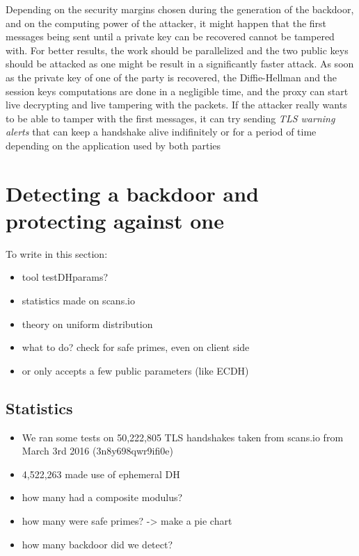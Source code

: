 \documentclass[a4paper,11pt,twocolumn]{article}
\begin{document}
Depending on the security margins chosen during the generation of the backdoor, and on the computing power of the attacker, it might happen that the first messages being sent until a private key can be recovered cannot be tampered with. For better results, the work should be parallelized and the two public keys should be attacked as one might be result in a significantly faster attack. As soon as the private key of one of the party is recovered, the Diffie-Hellman and the session keys computations are done in a negligible time, and the proxy can start live decrypting and live tampering with the packets. If the attacker really wants to be able to tamper with the first messages, it can try sending \emph{TLS warning alerts} that can keep a handshake alive indifinitely or for a period of time depending on the application used by both parties

\section{Detecting a backdoor and protecting against one}

To write in this section:

\begin{itemize}
    \item tool testDHparams?
    \item statistics made on scans.io
    \item theory on uniform distribution
    \item what to do? check for safe primes, even on client side
    \item or only accepts a few public parameters (like ECDH)
\end{itemize}

\subsection{Statistics}

\begin{itemize}
    \item We ran some tests on 50,222,805 TLS handshakes taken from scans.io from March 3rd 2016 (3n8y698qwr9ifi0e)
    \item 4,522,263 made use of ephemeral DH
    \item how many had a composite modulus?
    \item how many were safe primes? -> make a pie chart
    \item how many backdoor did we detect?
\end{itemize}
\end{document}

